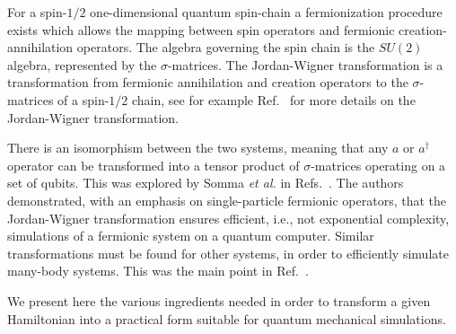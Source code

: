 \documentclass[aps,pra,twocolumn,floatfix]{revtex4}
\begin{document}
For a spin-$1/2$ one-dimensional quantum spin-chain a fermionization
procedure exists 
which allows the mapping between spin operators and fermionic
creation-annihilation operators.
The algebra governing the spin chain is the $SU(2)$ algebra, represented by
the $\sigma$-matrices. The Jordan-Wigner transformation is a
transformation from fermionic annihilation and creation operators to
the $\sigma$-matrices of a spin-$1/2$ chain, see
for example Ref.~\cite{dargis1998} for more details on the Jordan-Wigner
transformation. 

There is an isomorphism 
between the two systems, meaning that any $a$ or $a^\dag$ operator can be
transformed into a tensor product of $\sigma$-matrices operating on a
set of qubits. This was explored by Somma {\em et al.} in Refs.~\cite{somma2002,ortiz2002}.  
The authors demonstrated, with an emphasis on single-particle fermionic operators,  
that the Jordan-Wigner transformation
ensures efficient, i.e., not exponential complexity, simulations of a
fermionic system on a quantum computer. 
Similar transformations must be found for other systems, in order to
efficiently simulate many-body systems. This was the main
point in Ref.~\cite{somma2002}. 

We present here the various ingredients needed in order to transform a given 
Hamiltonian into a practical form suitable  for quantum mechanical simulations. 
\end{document}
